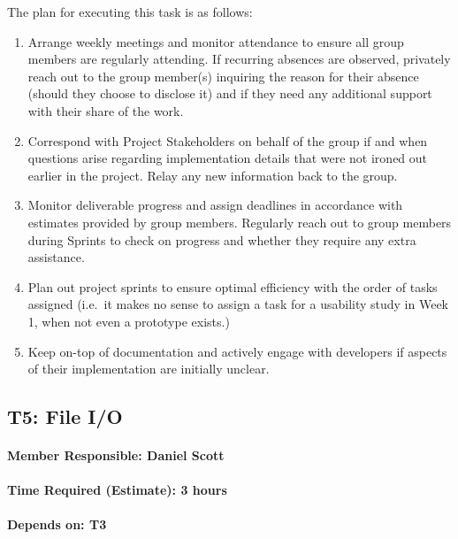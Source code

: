\documentclass[
  english,
  paper=a4,
  oneside  ,captions=tableheading
]{scrbook}
\begin{document}
The plan for executing this task is as follows:

\begin{enumerate}
	\item Arrange weekly meetings and monitor attendance to ensure all group members are regularly attending. If recurring absences are observed, privately reach out to the group member(s) inquiring the reason for their absence (should they choose to disclose it) and if they need any additional support with their share of the work.
	\item Correspond with Project Stakeholders on behalf of the group if and when questions arise regarding implementation details that were not ironed out earlier in the project. Relay any new information back to the group. 
	\item Monitor deliverable progress and assign deadlines in accordance with estimates provided by group members. Regularly reach out to group members during Sprints to check on progress and whether they require any extra assistance.
	\item Plan out project sprints to ensure optimal efficiency with the order of tasks assigned (i.e.~it makes no sense to assign a task for a usability study in Week 1, when not even a prototype exists.) 
	\item Keep on-top of documentation and actively engage with developers if aspects of their implementation are initially unclear.
\end{enumerate}

\newpage
\hypertarget{t5-file-io}{%
\subsection{T5: File I/O}\label{t5-file-io}}

\hypertarget{member-responsible-daniel-scott-1}{%
\paragraph{Member Responsible: Daniel
Scott}\label{member-responsible-daniel-scott-1}}

\hypertarget{time-required-estimate-3-hours}{%
\paragraph{Time Required (Estimate): 3
hours}\label{time-required-estimate-3-hours}}

\hypertarget{depends-on-t3}{%
\paragraph{Depends on: T3}\label{depends-on-t3}}
\end{document}
